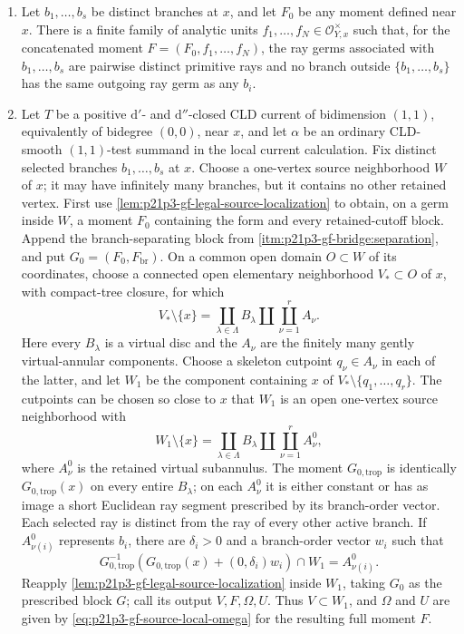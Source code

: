 \begin{proposition}
\begin{enumerate}
\item\label{itm:p21p3-gf-bridge:separation}
Let \(b_1,\ldots,b_s\) be distinct branches at \(x\), and let \(F_0\) be
any moment defined near \(x\).  There is a finite family of analytic units
\(f_1,\ldots,f_N\in\mathcal O_{Y,x}^{\times}\) such that, for the
concatenated moment \(F=(F_0,f_1,\ldots,f_N)\), the ray germs associated
with \(b_1,\ldots,b_s\) are pairwise distinct primitive rays and no branch
outside \(\{b_1,\ldots,b_s\}\) has the same outgoing ray germ as any
\(b_i\).

\item\label{itm:p21p3-gf-bridge:localization}
Let \(T\) be a positive \(\mathrm d'\)- and \(\mathrm d''\)-closed CLD
current of bidimension \((1,1)\), equivalently of bidegree \((0,0)\), near
\(x\), and let \(\alpha\) be an ordinary CLD-smooth \((1,1)\)-test summand
in the local current calculation.  Fix distinct selected branches
\(b_1,\ldots,b_s\) at \(x\).  Choose a one-vertex source neighborhood
\(W\) of \(x\); it may have
infinitely many branches, but it contains no other retained vertex.  First use
\cref{lem:p21p3-gf-legal-source-localization} to obtain, on a germ inside
\(W\), a moment \(F_0\) containing the form and every retained-cutoff block.
Append the branch-separating block from
\cref{itm:p21p3-gf-bridge:separation}, and put
\(G_0=(F_0,F_{\mathrm{br}})\).  On a common open domain \(O\subset W\) of
its coordinates, choose a connected open elementary neighborhood
\(V_*\subset O\) of \(x\), with compact-tree closure, for which
\[
 V_*\setminus\{x\}
   =\coprod_{\lambda\in\Lambda}B_\lambda
      \amalg\coprod_{\nu=1}^{r}A_\nu .
\]
Here every \(B_\lambda\) is a virtual disc and the \(A_\nu\) are the
finitely many gently virtual-annular components.  Choose a skeleton cutpoint
\(q_\nu\in A_\nu\) in each of the latter, and let \(W_1\) be the component
containing \(x\) of
\(V_*\setminus\{q_1,\ldots,q_r\}\).  The cutpoints can be chosen so close to
\(x\) that \(W_1\) is an open one-vertex source neighborhood with
\[
 W_1\setminus\{x\}
   =\coprod_{\lambda\in\Lambda}B_\lambda
      \amalg\coprod_{\nu=1}^{r}A_\nu^0,
\]
where \(A_\nu^0\) is the retained virtual subannulus.  The moment
\(G_{0,\mathrm{trop}}\) is identically \(G_{0,\mathrm{trop}}(x)\) on every
entire \(B_\lambda\); on each \(A_\nu^0\) it is either constant or has as
image a short Euclidean ray segment prescribed by its branch-order vector.
Each selected ray is distinct from the ray of every other active branch.
If \(A_{\nu(i)}^0\) represents \(b_i\), there are \(\delta_i>0\) and a
branch-order vector \(w_i\) such that
\begin{equation}
 G_{0,\mathrm{trop}}^{-1}\!\left(
   G_{0,\mathrm{trop}}(x)+(0,\delta_i)w_i\right)\cap W_1
   =A_{\nu(i)}^0.
 \label{eq:p21p3-gf-preliminary-exact-source-locator}
\end{equation}
Reapply
\cref{lem:p21p3-gf-legal-source-localization} inside \(W_1\), taking \(G_0\)
as the prescribed block \(G\); call its output \(V,F,\Omega,U\).  Thus
\(V\subset W_1\), and \(\Omega\) and \(U\) are given by
\eqref{eq:p21p3-gf-source-local-omega} for the resulting full moment \(F\).


\end{enumerate}
\end{proposition}
